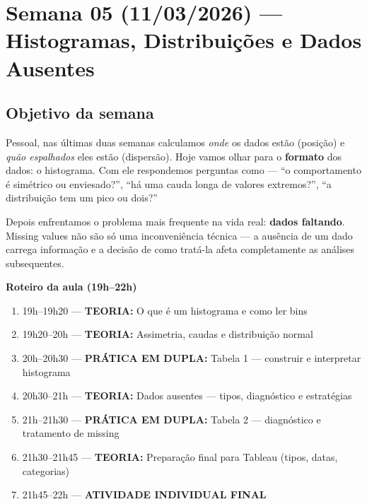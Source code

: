 
\chapter{Semana 05 (11/03/2026) — Histogramas, Distribuições e Dados Ausentes}

\section{Objetivo da semana}

Pessoal, nas últimas duas semanas calculamos \emph{onde} os dados estão
(posição) e \emph{quão espalhados} eles estão (dispersão). Hoje vamos olhar
para o \textbf{formato} dos dados: o histograma. Com ele respondemos perguntas
como — ``o comportamento é simétrico ou enviesado?'', ``há uma cauda
longa de valores extremos?'', ``a distribuição tem um pico ou dois?''

Depois enfrentamos o problema mais frequente na vida real: \textbf{dados
faltando}. Missing values não são só uma inconveniência técnica — a ausência
de um dado carrega informação e a decisão de como tratá-la afeta completamente
as análises subsequentes.

\begin{BoardBox}
\textbf{Roteiro da aula (19h–22h)}
\begin{enumerate}
  \item 19h–19h20 — \textbf{TEORIA:} O que é um histograma e como ler bins
  \item 19h20–20h — \textbf{TEORIA:} Assimetria, caudas e distribuição normal
  \item 20h–20h30 — \textbf{PRÁTICA EM DUPLA:} Tabela 1 — construir e interpretar histograma
  \item 20h30–21h — \textbf{TEORIA:} Dados ausentes — tipos, diagnóstico e estratégias
  \item 21h–21h30 — \textbf{PRÁTICA EM DUPLA:} Tabela 2 — diagnóstico e tratamento de missing
  \item 21h30–21h45 — \textbf{TEORIA:} Preparação final para Tableau (tipos, datas, categorias)
  \item 21h45–22h — \textbf{ATIVIDADE INDIVIDUAL FINAL}
\end{enumerate}
\end{BoardBox}

